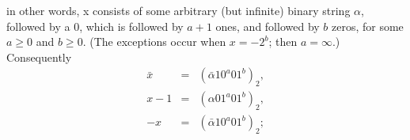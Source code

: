 \documentclass{article}
\begin{document}
in other words, x consists of some arbitrary (but infinite) binary string $\alpha$, followed by
a 0, which is followed by $a+1$ ones, and followed by $b$ zeros, for some $a\ge 0$ and $b\ge 0$.
(The exceptions occur when $x = -2^b$; then $a=\infty$.) Consequently
\begin{eqnarray}
  \bar x &=& (\bar \alpha 1 0^a 0 1^b)_2,\\
  x - 1 &=& (\alpha 0 1^a 0 1^b)_2,\\
  - x &=& (\bar \alpha 1 0^a 0 1^b)_2;
\end{eqnarray}
\end{document}
